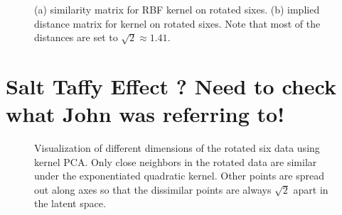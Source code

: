 \begin{figure}
  \caption{(a) similarity matrix for RBF kernel on rotated sixes. (b) implied
    distance matrix for kernel on rotated sixes. Note that most of the
    distances are set to $\sqrt{2}\approx1.41$.}

\end{figure}



\section{Salt Taffy Effect ? Need to check what John was referring to!}

\begin{figure}
  \begin{center}
    \subfigure[]{}\hfill\subfigure[]{}
  \end{center}
  \caption{Visualization of different dimensions of the rotated six
    data using kernel PCA. Only close neighbors in the rotated data
    are similar under the exponentiated quadratic kernel. Other points
    are spread out along axes so that the dissimilar points are always
    $\sqrt{2}$ apart in the latent space.}
\end{figure}






